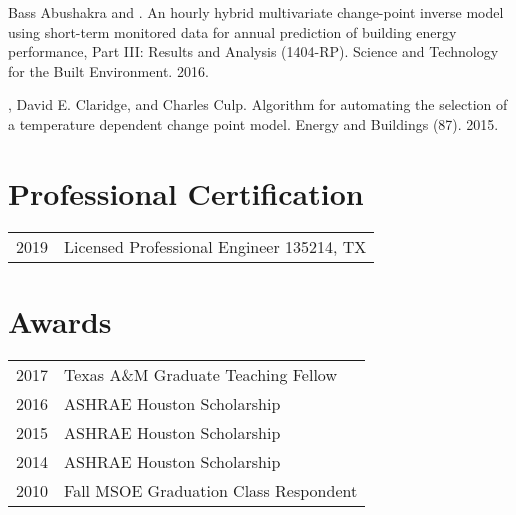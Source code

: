 \documentclass[]{deedy-resume-openfont}
\begin{document}
\begin{minipage}[t]{0.66\textwidth}
Bass Abushakra and . An hourly hybrid
multivariate change-point inverse model using short-term monitored data for
annual prediction of building energy performance, {Part III}: Results and Analysis
({1404-RP}). Science and Technology for the Built Environment. 2016.
\sectionsep

, David E. Claridge, and Charles Culp. Algorithm
for automating the selection of a temperature dependent change point model.
Energy and Buildings (87). 2015.





\section{Professional Certification}

\begin{tabular}{rl}
    2019 & Licensed Professional Engineer 135214, TX \\
\end{tabular}

\section{Awards}

\begin{tabular}{rl}
    2017 & Texas A\&M Graduate Teaching Fellow                   \\
    2016 & ASHRAE Houston Scholarship                            \\
    2015 & ASHRAE Houston Scholarship                            \\
    2014 & ASHRAE Houston Scholarship                            \\
    2010 & Fall MSOE Graduation Class Respondent \\
\end{tabular}


\end{minipage}
\end{document}
